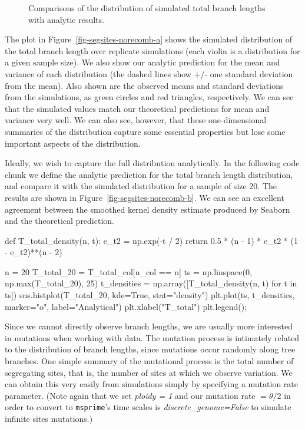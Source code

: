 \documentclass[graybox]{svmult}
\newcommand{\msprime}[0]{\texttt{msprime}}
\begin{document}
\begin{figure}[t]
\centering
{}
\qquad\qquad
{}
\caption{\label{fig-segsites-norecomb}
Comparisons of the distribution of simulated total branch lengths
with analytic results.
}
\end{figure}

    The plot in Figure~\ref{fig-segsites-norecomb-a} shows the simulated
distribution of the total branch length
over replicate simulations (each violin is a distribution for a given
sample size). We also show our analytic prediction for the mean and
variance of each distribution (the dashed lines show +/- one standard
deviation from the mean). Also shown are the observed means and standard
deviations from the simulations, as green circles and red triangles,
respectively. We can see that the simulated values match our theoretical
predictions for mean and variance very well. We can also see, however,
that these one-dimensional summaries of the distribution capture some
essential properties but lose some important aspects of the
distribution.

    Ideally, we wish to capture the full distribution analytically. In the following code chunk we define the analytic
prediction for the total branch length distribution, and compare it with the simulated distribution for a sample of size 20. The results are shown in
Figure~\ref{fig-segsites-norecomb-b}. We can see an excellent agreement between
the smoothed kernel
density estimate produced by Seaborn and the theoretical prediction.

\begin{pythoncode}
def T_total_density(n, t):
    e_t2 = np.exp(-t / 2)
    return 0.5 * (n - 1) * e_t2 * (1 - e_t2)**(n - 2)

n = 20
T_total_20 = T_total_col[n_col == n]
ts = np.linspace(0, np.max(T_total_20), 25)
t_densities = np.array([T_total_density(n, t) for t in ts])
sns.histplot(T_total_20, kde=True, stat="density")
plt.plot(ts, t_densities, marker="o", label="Analytical")
plt.xlabel("T_total")
plt.legend();
\end{pythoncode}

Since we cannot directly observe branch lengths, we are usually more
interested in mutations when working with data. The mutation process is
intimately related to the distribution of branch lengths, since
mutations occur randomly along tree branches. One simple summary of the
mutational process is the total number of segregating sites, that is, the number of
sites at which we observe variation. We can obtain this very
easily from simulations simply by specifying a mutation rate parameter.
(Note again that we set \emph{ploidy = 1} and our mutation rate
\(= \theta / 2\) in order to convert to \msprime's time scales
is \emph{discrete\_genome=False} to simulate infinite sites
mutations.)
\end{document}
